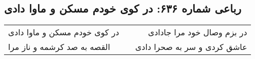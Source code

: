 \begin{center}
\section*{رباعی شماره ۶۳۶: در کوی خودم مسکن و ماوا دادی}
\label{sec:sh636}
\begin{longtable}{l p{0.5cm} r}
در کوی خودم مسکن و ماوا دادی
&&
در بزم وصال خود مرا جادادی
\\
القصه به صد کرشمه و ناز مرا
&&
عاشق کردی و سر به صحرا دادی
\\
\end{longtable}
\end{center}
